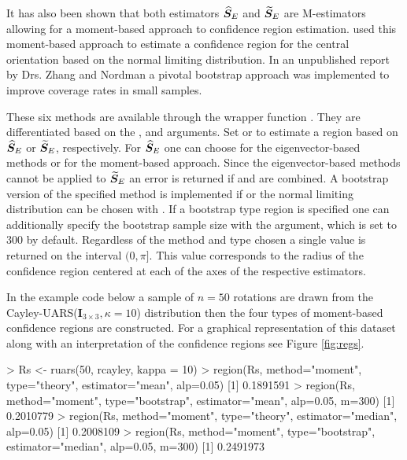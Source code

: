 It has also been shown that both estimators $\widehat{\bm S}_E$ and $\widetilde{\bm S}_E$ are M-estimators allowing for a moment-based approach to confidence region estimation.  \cite{chang2001} used this moment-based approach to estimate a confidence region for the central orientation based on the normal limiting distribution.  In an unpublished report by Drs. Zhang and Nordman a pivotal bootstrap approach was implemented to improve coverage rates in small samples.

These six methods are available through the wrapper function .  They are differentiated based on the ,  and  arguments.  Set  or   to estimate a region based on $\widehat{\bm S}_E$ or $\widetilde{\bm S}_E$, respectively.  For $\widehat{\bm S}_E$ one can choose  for the eigenvector-based methods or  for the moment-based approach.  Since the eigenvector-based methods cannot be applied to $\widetilde{\bm S}_E$ an error is returned if  and  are combined.  A bootstrap version of the specified method is implemented if  or the normal limiting distribution can be chosen with .  If a bootstrap type region is specified one can additionally specify the bootstrap sample size with the  argument, which is set to 300 by default.  Regardless of the method and type chosen a single value is returned on the interval $(0,\pi]$.  This value corresponds to the radius of the confidence region centered at each of the axes of the respective estimators.  

In the example code below a sample of $n=50$ rotations are drawn from the Cayley-UARS($\bm I_{3\times 3}, \kappa=10$) distribution then the four types of moment-based confidence regions are constructed.  For a graphical representation of this dataset along with an interpretation of the confidence regions see Figure \ref{fig:regs}.

\begin{example}
> Rs <- ruars(50, rcayley, kappa = 10)
> region(Rs, method="moment", type="theory", estimator="mean", alp=0.05)
[1] 0.1891591
> region(Rs, method="moment", type="bootstrap", estimator="mean", alp=0.05, m=300)
[1] 0.2010779
> region(Rs, method="moment", type="theory", estimator="median", alp=0.05)
[1] 0.2008109
> region(Rs, method="moment", type="bootstrap", estimator="median", alp=0.05, m=300)
[1] 0.2491973
\end{example}

